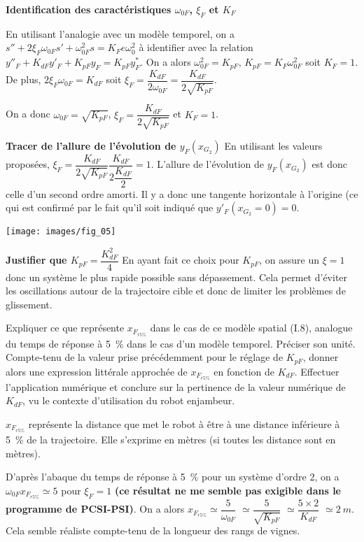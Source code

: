 \documentclass[11pt]{article}
\begin{document}
\begin{UPSTIcorrige}

\textbf{Identification des  caractéristiques $\omega_{0F}$, $\xi_F$ et $K_F$}

En utilisant l'analogie avec un modèle temporel, on a $s'' + 2\xi_F\omega_{0F} s' + \omega_{0F}^2 s = K_Fe\omega_0^2$ à identifier avec la relation $y''_F+K_{dF}y'_F+K_{pF}y_F=K_{pF}y^*_F$.
On a alors  $\omega_{0F}^2 =K_{pF}$, $K_{pF} = K_F\omega_{0F}^2$ soit $K_F=1$. De plus, $2\xi_F\omega_{0F} = K_{dF}$ soit $\xi_F = \dfrac{K_{dF}}{2\omega_{0F}}= \dfrac{K_{dF}}{2\sqrt{K_{pF}}}$.

On a donc $\omega_{0F}=\sqrt{K_{pF}}$, $\xi_F=\dfrac{K_{dF}}{2\sqrt{K_{pF}}} $ et $K_F=1$.


\textbf{Tracer de l’allure de l’évolution de  $y_F\left(x_{G_2}\right)$}
En utilisant les valeurs proposées, $\xi_F=\dfrac{K_{dF}}{2\sqrt{K_{pF}}}\dfrac{K_{dF}}{2\dfrac{K_{dF}}{2}} =1 $. L'allure de l'évolution de $y_F\left(x_{G_2}\right)$ est donc celle d'un second ordre amorti. Il y a donc une tangente horizontale à l'origine (ce qui est confirmé par le fait qu'il soit indiqué que $y'_F\left(x_{G_2}=0\right)=0$.

\begin{center}
\texttt{[image: images/fig\_05]}
\end{center}
\textbf{Justifier que $K_{pF}=\dfrac{K^2_{dF}}{4}$}
En ayant fait ce choix pour $K_{pF}$, on assure un $\xi=1$ donc un système le plus rapide possible sans dépassement. 
Cela permet d'éviter les oscillations autour de la trajectoire cible et donc de limiter les problèmes de glissement. 

\end{UPSTIcorrige}


\UPSTIquestion Expliquer ce que représente $x_{F_{r5\%}}$ dans le cas de ce modèle spatial (I.8), analogue du temps de réponse à \SI{5}{\%} dans le cas d’un modèle temporel. Préciser son unité. Compte-tenu de la valeur prise précédemment pour le réglage de $K_{pF}$, donner alors une expression littérale approchée de  $x_{F_{r5\%}}$ en fonction de $K_{dF}$. Effectuer
l’application numérique et conclure sur la pertinence de la valeur numérique de $K_{dF}$, vu le contexte d’utilisation
du robot enjambeur.

\begin{UPSTIcorrige}
$x_{F_{r5\%}}$ représente la distance que met le robot à être à une distance inférieure à \SI{5}{\%} de la trajectoire. Elle s'exprime en mètres (si toutes les distance sont en mètres).

D'après l'abaque du temps de réponse à \SI{5}{\%} pour un système d'ordre 2, on a  $\omega_{0F} x_{F_{r5\%}}\simeq 5$ pour $\xi_F=1$  \textbf{(ce résultat ne me semble pas exigible dans le programme de PCSI-PSI)}. On a alors 
$x_{F_{r5\%}} \simeq \dfrac{5}{\omega_{0F} }$ $\simeq\dfrac{5}{\sqrt{K_{pF}}}$ $\simeq \dfrac{5\times 2}{K_{dF}}$ $\simeq \SI{2}{m}$.
Cela semble réaliste compte-tenu de la longueur des rangs de vignes.
\end{UPSTIcorrige}
\end{document}
